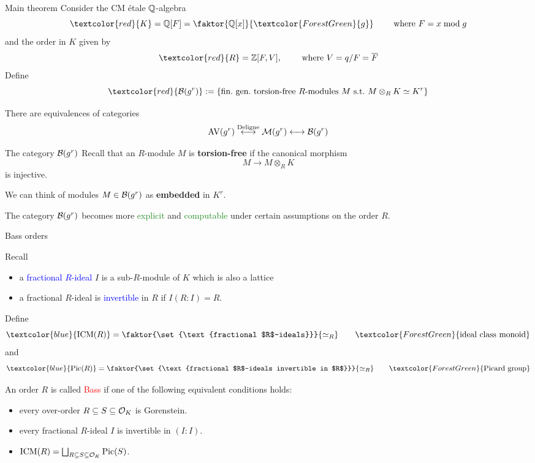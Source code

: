 \documentclass[usenames,dvipsnames]{beamer}
\DeclareMathOperator{\AV}{AV}
\newcommand{\red}[1]{\textcolor{red}{#1}}
\newcommand{\blue}[1]{\textcolor{blue}{#1}}
\newcommand{\green}[1]{\textcolor{ForestGreen}{#1}}
\begin{document}
\begin{frame}{Main theorem}
Consider the CM \'etale $\mathbb{Q}$-algebra
\[ \red{K} = \Q[F] = \faktor{\Q[x]}{\green{g}} \qquad \text{ where }F=x \mod g \]
\pause and the order in $K$ given by
\[ \red{R} = \Z[F,V], \qquad \text{ where }V=q/F=\overline{F}\]
\pause Define
\[\red{\cB(g^r)}:=\set{ \text{fin.~gen.~torsion-free $R$-modules $M$ s.t.~$M\otimes_R K\simeq K^r$} } \]
\pause
\begin{thm}[M.]
 There are equivalences of categories
 \[ \AV(g^r) \overset{\text{Deligne}}{\longleftrightarrow} \cM(g^r) \longleftrightarrow \cB(g^r) \]
\end{thm}
\end{frame}

\begin{frame}{ The category ${\mathcal B}(g^r)$ }
Recall that an $R$-module $M$ is \textbf{torsion-free} if the canonical morphism
\[ M \to M\otimes_R K \]
is injective.

\pause We can think of modules $M\in {\mathcal B}(g^r)$ as \textbf{embedded} in $K^r$.

\pause The category ${\mathcal B}(g^r)$ becomes more \green{explicit} and \green{computable} under certain assumptions on the order $R$.
\end{frame}

\begin{frame}{ Bass orders }

Recall 
\begin{itemize}
 \item a \blue{fractional $R$-ideal} $I$ is a sub-$R$-module of $K$ which is also a lattice
 \item a fractional $R$-ideal is \blue{invertible} in $R$ if $I(R:I) =R$.
\end{itemize}

Define
\[ \blue{\ICM(R)} = \faktor{\set{\text{fractional $R$-ideals}}}{\simeq_R}\qquad\green{\text{ideal class monoid}}\]
and
\[ \blue{\Pic(R)} = \faktor{\set{\text{fractional $R$-ideals invertible in $R$}}}{\simeq_R} \qquad\green{\text{Picard group}} \]

An order $R$ is called \red{Bass} if one of the following equivalent conditions holds:
\begin{itemize}
 \pause \item every over-order $R\subseteq S \subseteq {\mathcal O}_K$ is Gorenstein.
 \pause \item every fractional $R$-ideal $I$ is invertible in $(I:I)$.
 \pause \item $\operatorname{ICM}(R) = \bigsqcup_{R\subseteq S\subseteq {\mathcal O}_K} \operatorname{Pic}(S)$.
\end{itemize}

\end{frame}
\end{document}
